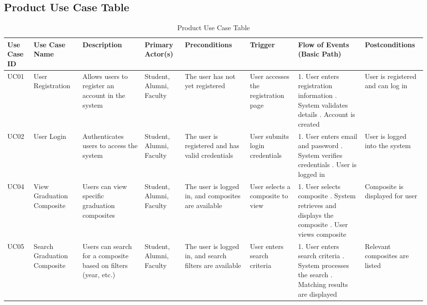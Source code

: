 \documentclass[12pt]{article}
\begin{document}
\pagebreak

\begin{landscape}
\subsection{Product Use Case Table}
\begin{table}[H]
\centering
\caption{Product Use Case Table}
\renewcommand{\arraystretch}{1.3}
\begin{adjustbox}{max width=\linewidth}
\begin{tabular}{|p{1.3cm}|p{2.5cm}|p{3.5cm}|p{2.5cm}|p{2.5cm}|p{2cm}|p{6cm}|p{3.5cm}|}
\hline
\textbf{Use Case ID} & \textbf{Use Case Name} & \textbf{Description} & \textbf{Primary Actor(s)} & \textbf{Preconditions} & \textbf{Trigger} & \textbf{Flow of Events (Basic Path)} & \textbf{Postconditions} \\
\hline

UC01 & User Registration & Allows users to register an account in the system & Student, Alumni, Faculty & The user has not yet registered & User accesses the registration page & 
1. User enters registration information \newline
2. System validates details \newline
3. Account is created & 
User is registered and can log in \\
\hline

UC02 & User Login & Authenticates users to access the system & Student, Alumni, Faculty & The user is registered and has valid credentials & User submits login credentials & 
1. User enters email and password \newline
2. System verifies credentials \newline
3. User is logged in & 
User is logged into the system \\
\hline

UC04 & View Graduation Composite & Users can view specific graduation composites & Student, Alumni, Faculty & The user is logged in, and composites are available & User selects a composite to view & 
1. User selects composite \newline
2. System retrieves and displays the composite \newline
3. User views composite & 
Composite is displayed for user \\
\hline

UC05 & Search Graduation Composite & Users can search for a composite based on filters (year, etc.) & Student, Alumni, Faculty & The user is logged in, and search filters are available & User enters search criteria & 
1. User enters search criteria \newline
2. System processes the search \newline
3. Matching results are displayed & 
Relevant composites are listed \\
\hline

\end{tabular}
\end{adjustbox}
\end{table}
\end{landscape}
\restoregeometry
\end{document}
